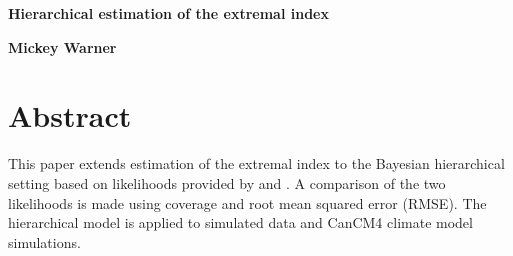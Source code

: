 \begin{Large}
\noindent \textbf{Hierarchical estimation of the extremal index}
\end{Large}
\bigskip

\noindent \textbf{Mickey Warner}

\section{Abstract}
\label{abstract}

This paper extends estimation of the extremal index to the Bayesian hierarchical setting based on likelihoods provided by \cite{ferro2003inference} and \cite{suveges2010model}. A comparison of the two likelihoods is made using coverage and root mean squared error (RMSE). The hierarchical model is applied to simulated data and CanCM4 climate model simulations.
